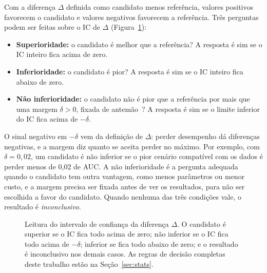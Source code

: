 Com a diferença $\Delta$ definida como candidato menos referência, valores positivos favorecem o candidato e valores negativos favorecem a referência. Três perguntas podem ser feitas sobre o IC de $\Delta$ (Figura~\ref{fig:nao_inferioridade}):
\begin{itemize}
    \item \textbf{Superioridade:} o candidato é melhor que a referência? A resposta é sim se o IC inteiro fica acima de zero.
    \item \textbf{Inferioridade:} o candidato é pior? A resposta é sim se o IC inteiro fica abaixo de zero.
    \item \textbf{Não inferioridade:} o candidato não é pior que a referência por mais que uma margem $\delta > 0$, fixada de antemão~\cite{piaggio2012reporting}? A resposta é sim se o limite inferior do IC fica acima de $-\delta$.
\end{itemize}
O sinal negativo em $-\delta$ vem da definição de $\Delta$: perder desempenho dá diferenças negativas, e a margem diz quanto se aceita perder no máximo. Por exemplo, com $\delta = 0{,}02$, um candidato é não inferior se o pior cenário compatível com os dados é perder menos de 0,02 de AUC. A não inferioridade é a pergunta adequada quando o candidato tem outra vantagem, como menos parâmetros ou menor custo, e a margem precisa ser fixada antes de ver os resultados, para não ser escolhida a favor do candidato. Quando nenhuma das três condições vale, o resultado é \emph{inconclusivo}.

\begin{figure}[htpb]
\centering
{}
\caption{Leitura do intervalo de confiança da diferença $\Delta$. O candidato é superior se o IC fica todo acima de zero; não inferior se o IC fica todo acima de $-\delta$; inferior se fica todo abaixo de zero; e o resultado é inconclusivo nos demais casos. As regras de decisão completas deste trabalho estão na Seção~\ref{sec:stats}.}
\label{fig:nao_inferioridade}
\end{figure}
